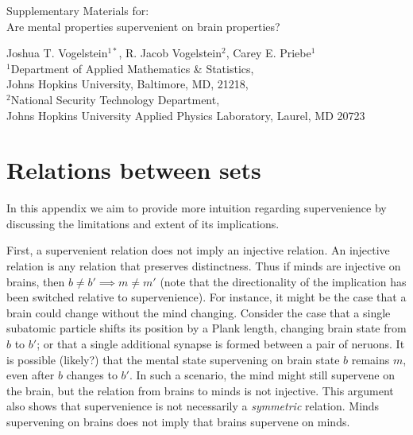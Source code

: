 \documentclass{article}
\begin{document}
	\begin{center}
{\huge	Supplementary Materials for: \\ Are mental properties supervenient on brain properties?}
\end{center}

\vspace{5px}

\begin{center}
{\large		
Joshua T. Vogelstein$^{1*}$, R. Jacob Vogelstein$^2$, Carey E. Priebe$^1$\\
	$^1$Department of Applied Mathematics \& Statistics, \\ Johns Hopkins University, Baltimore, MD, 21218,\\ $^2$National Security Technology Department, \\ Johns Hopkins University Applied Physics Laboratory, Laurel, MD 20723}
	
\end{center}

\vspace{5px}





\section{Relations between sets} %
\label{sec:relations}

In this appendix we aim to provide more intuition regarding supervenience by discussing the limitations and extent of its implications. 


First, a supervenient relation does not imply an injective relation.  An injective relation is any relation that preserves distinctness.  Thus if minds are injective on brains, then $b\neq b' \implies m \neq m'$ (note that the directionality of the implication has been switched relative to supervenience). For instance, it might be the case that a brain could change without the mind changing.  Consider the case that a single subatomic particle shifts its position by a Plank length, changing brain state from $b$ to $b'$; or that a single additional synapse is formed between a pair of neruons.  It is possible (likely?) that the mental state supervening on brain state $b$ remains $m$, even after $b$ changes to $b'$.  In such a scenario, the mind might still supervene on the brain, but the relation from brains to minds is not injective. This argument also shows that supervenience is not necessarily a \emph{symmetric} relation.  Minds supervening on brains does not imply that brains supervene on minds.  
\end{document}
